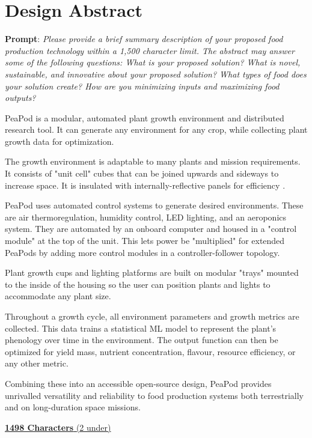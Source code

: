 \documentclass{report}
\begin{document}
\tableofcontents
\newpage

\section{Design Abstract}
\textbf{Prompt}: \textit{Please provide a brief summary description of your proposed food production technology within a 1,500 character limit. The abstract may answer some of the following questions: What is your proposed solution? What is novel, sustainable, and innovative about your proposed solution? What types of food does your solution create? How are you minimizing inputs and maximizing food outputs?}

PeaPod is a modular, automated plant growth environment and distributed research tool. It can generate any environment for any crop, while collecting plant growth data for optimization.

The growth environment is adaptable to many plants and mission requirements. It consists of "unit cell" cubes that can be joined upwards and sideways to increase space. It is insulated with internally-reflective panels for efficiency \cite{insulation}.

PeaPod uses automated control systems to generate desired environments. These are air thermoregulation, humidity control, LED lighting, and an aeroponics system. They are automated by an onboard computer and housed in a "control module" at the top of the unit. This lets power be "multiplied" for extended PeaPods by adding more control modules in a controller-follower topology.

Plant growth cups and lighting platforms are built on modular "trays" mounted to the inside of the housing so the user can position plants and lights to accommodate any plant size.

Throughout a growth cycle, all environment parameters and growth metrics are collected. This data trains a statistical ML model to represent the plant's phenology over time in the environment. The output function can then be optimized for yield mass, nutrient concentration, flavour, resource efficiency, or any other metric.

Combining these into an accessible open-source design, PeaPod provides unrivalled versatility and reliability to food production systems both terrestrially and on long-duration space missions.

\uline{\textbf{1498 Characters} (2 under)}

\newpage
\end{document}
